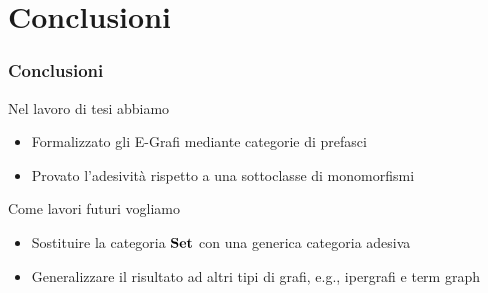\documentclass[8pt]{beamer}
\begin{document}
\section{Conclusioni}
\begin{frame}\frametitle{Conclusioni}
	Nel lavoro di tesi abbiamo
	\begin{itemize}
		\item Formalizzato gli E-Grafi mediante categorie di prefasci
		\item Provato l'adesivit\`a rispetto a una sottoclasse di monomorfismi
	\end{itemize}

	Come lavori futuri vogliamo \begin{itemize}
		\item Sostituire la categoria $\mathbf{Set}$ con una generica categoria adesiva
		\item Generalizzare il risultato ad altri tipi di grafi, e.g., ipergrafi e term graph
	\end{itemize}
\end{frame}
\end{document}
